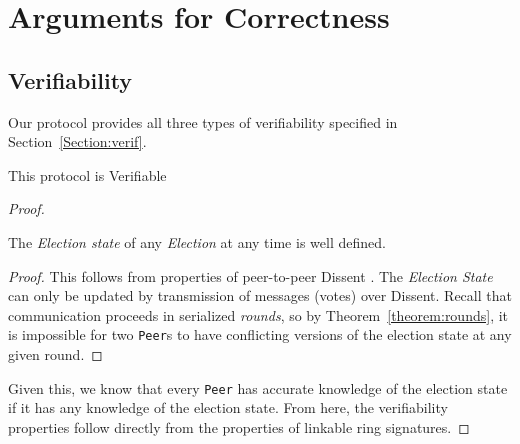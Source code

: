 \section{Arguments for Correctness}
\subsection{Verifiability}
Our protocol provides all three types of verifiability specified in
Section~\ref{Section:verif}.

\begin{theorem} This protocol is Verifiable\end{theorem}

\begin{proof}

  \begin{lemma}The \emph{Election state} of any \emph{Election} at
  any time is well defined. \end{lemma}
  \begin{proof}This follows from properties of peer-to-peer Dissent \cite{sec}.
    The \emph{Election State} can only be updated by transmission of messages
    (votes) over Dissent. Recall that communication proceeds in serialized
    \emph{rounds}, so by Theorem~\ref{theorem:rounds}, it is impossible for two
    \texttt{Peer}s to have conflicting versions of the election state at any
    given round.
  \end{proof}

  Given this, we know that every \texttt{Peer} has accurate knowledge of the
  election state if it has any knowledge of the election state. From here, the
  verifiability properties follow directly from the properties of linkable ring
  signatures.


\end{proof}
